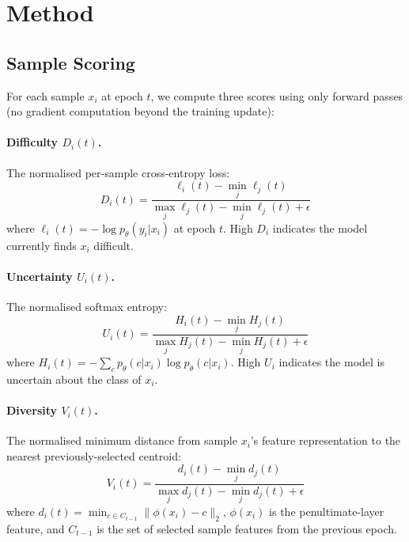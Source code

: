 \documentclass[10pt,twocolumn]{article}
\begin{document}
\section{Method}
\label{sec:method}

\subsection{Sample Scoring}

For each sample $x_i$ at epoch $t$, we compute three scores using only
forward passes (no gradient computation beyond the training update):

\paragraph{Difficulty $D_i(t)$.}
The normalised per-sample cross-entropy loss:
\begin{equation}
  D_i(t) = \frac{\ell_i(t) - \min_j \ell_j(t)}{\max_j \ell_j(t) - \min_j \ell_j(t) + \epsilon}
\end{equation}
where $\ell_i(t) = -\log p_\theta(y_i | x_i)$ at epoch $t$.
High $D_i$ indicates the model currently finds $x_i$ difficult.

\paragraph{Uncertainty $U_i(t)$.}
The normalised softmax entropy:
\begin{equation}
  U_i(t) = \frac{H_i(t) - \min_j H_j(t)}{\max_j H_j(t) - \min_j H_j(t) + \epsilon}
\end{equation}
where $H_i(t) = -\sum_c p_\theta(c|x_i) \log p_\theta(c|x_i)$.
High $U_i$ indicates the model is uncertain about the class of $x_i$.

\paragraph{Diversity $V_i(t)$.}
The normalised minimum distance from sample $x_i$'s feature representation
to the nearest previously-selected centroid:
\begin{equation}
  V_i(t) = \frac{d_i(t) - \min_j d_j(t)}{\max_j d_j(t) - \min_j d_j(t) + \epsilon}
\end{equation}
where $d_i(t) = \min_{c \in C_{t-1}} \| \phi(x_i) - c \|_2$,
$\phi(x_i)$ is the penultimate-layer feature, and $C_{t-1}$ is the set of
selected sample features from the previous epoch.
\end{document}
